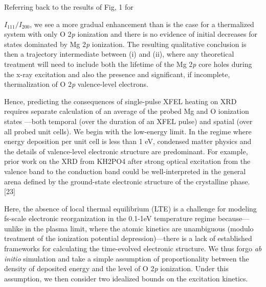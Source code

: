 Referring back to the results of Fig, 1
for
\(I_{111}/I_{200}\), we see a more gradual enhancement than is the case
for a thermalized system with only O 2\emph{p} ionization and there is
no evidence of initial decreases for states dominated by Mg 2\emph{p}
ionization. The resulting qualitative conclusion is then a trajectory
intermediate between (i) and (ii), where any theoretical treatment will
need to include both the lifetime of the Mg 2\emph{p} core holes during
the x-ray excitation and also the presence and significant, if
incomplete, thermalization of O 2\emph{p} valence-level electrons.

\FloatBarrier

Hence, predicting the consequences of single-pulse XFEL heating on XRD
requires separate calculation of an average of the probed Mg and O
ionization states ---both temporal (over the duration of an XFEL pulse)
and spatial (over all probed unit cells). We begin with the low-energy
limit. In the regime where energy deposition per unit cell is less than
1 eV, condensed matter physics and the details of valence-level
electronic structure are predominant. For example, prior work on the XRD
from KH2PO4 after strong optical excitation from the valence band to the
conduction band could be well-interpreted in the general arena defined
by the ground-state electronic structure of the crystalline phase.
{[}23{]}

Here, the absence of local thermal equilibrium (LTE) is a challenge for
modeling fs-scale electronic reorganization in the 0.1-1eV temperature
regime because---unlike in the plasma limit, where the atomic kinetics
are unambiguous (modulo treatment of the ionization potential
depression)---there is a lack of established frameworks for calculating
the time-evolved electronic structure. We thus forgo \emph{ab initio}
simulation and take a simple assumption of proportionality between the
density of deposited energy and the level of O 2\emph{p} ionization.
Under this assumption, we then consider two idealized bounds on the
excitation kinetics.

